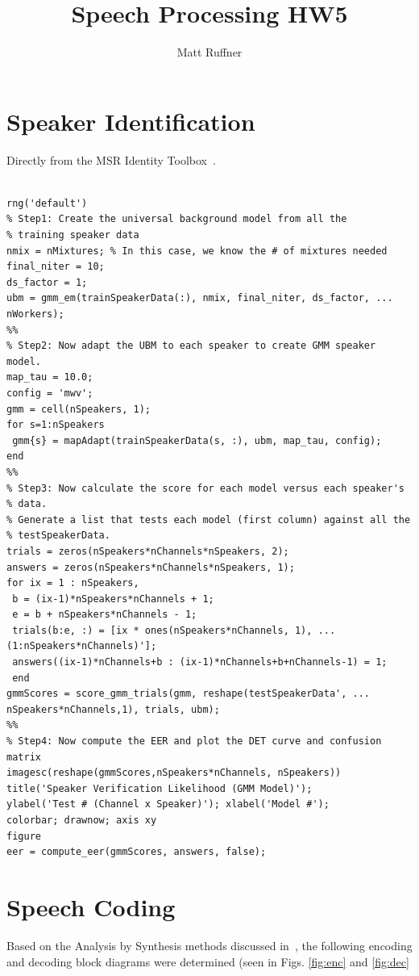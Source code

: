 \documentclass[letterpaper]{article}
\title{Speech Processing HW5}
\author{Matt Ruffner}
\begin{document}
\maketitle

\section{Speaker Identification}
Directly from the MSR Identity Toolbox~\cite{msr}. 

\begin{lstlisting}[caption = {GMM-UBM Training Code from THe MSR Toolbox.}]

rng('default')
% Step1: Create the universal background model from all the
% training speaker data
nmix = nMixtures; % In this case, we know the # of mixtures needed
final_niter = 10;
ds_factor = 1;
ubm = gmm_em(trainSpeakerData(:), nmix, final_niter, ds_factor, ...
nWorkers);
%%
% Step2: Now adapt the UBM to each speaker to create GMM speaker model.
map_tau = 10.0;
config = 'mwv';
gmm = cell(nSpeakers, 1);
for s=1:nSpeakers
 gmm{s} = mapAdapt(trainSpeakerData(s, :), ubm, map_tau, config);
end
%%
% Step3: Now calculate the score for each model versus each speaker's
% data.
% Generate a list that tests each model (first column) against all the
% testSpeakerData.
trials = zeros(nSpeakers*nChannels*nSpeakers, 2);
answers = zeros(nSpeakers*nChannels*nSpeakers, 1);
for ix = 1 : nSpeakers,
 b = (ix-1)*nSpeakers*nChannels + 1;
 e = b + nSpeakers*nChannels - 1;
 trials(b:e, :) = [ix * ones(nSpeakers*nChannels, 1), ...
(1:nSpeakers*nChannels)'];
 answers((ix-1)*nChannels+b : (ix-1)*nChannels+b+nChannels-1) = 1;
 end
gmmScores = score_gmm_trials(gmm, reshape(testSpeakerData', ...
nSpeakers*nChannels,1), trials, ubm);
%%
% Step4: Now compute the EER and plot the DET curve and confusion matrix
imagesc(reshape(gmmScores,nSpeakers*nChannels, nSpeakers))
title('Speaker Verification Likelihood (GMM Model)');
ylabel('Test # (Channel x Speaker)'); xlabel('Model #');
colorbar; drawnow; axis xy
figure
eer = compute_eer(gmmScores, answers, false);

\end{lstlisting}

\section{Speech Coding}

Based on the Analysis by Synthesis methods discussed in~\cite{info7020032}, the following encoding and decoding block diagrams were determined (seen in Figs. \ref{fig:enc} and \ref{fig:dec}
\end{document}
